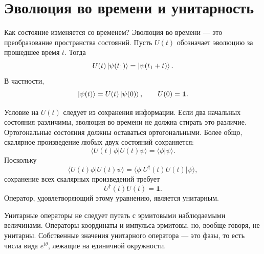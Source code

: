 \section{Эволюция во времени и унитарность}

Как состояние изменяется со временем? Эволюция во времени — это преобразование пространства состояний. Пусть \(U(t)\) обозначает эволюцию за прошедшее время \(t\). Тогда
\begin{equation}
U(t)\left\lvert\psi(t_1)\right\rangle=\left\lvert\psi(t_1+t)\right\rangle.
\end{equation}
В частности,
\begin{equation}
\left\lvert\psi(t)\right\rangle=U(t)\left\lvert\psi(0)\right\rangle,
\qquad
U(0)=\mathbf 1.
\end{equation}

Условие на \(U(t)\) следует из сохранения информации. Если два начальных состояния различимы, эволюция во времени не должна стирать это различие. Ортогональные состояния должны оставаться ортогональными. Более общо, скалярное произведение любых двух состояний сохраняется:
\begin{equation}
\langle U(t)\phi|U(t)\psi\rangle
=\langle\phi|\psi\rangle.
\end{equation}
Поскольку
\begin{equation}
\langle U(t)\phi|U(t)\psi\rangle
=\langle\phi|U^\dagger(t)U(t)|\psi\rangle,
\end{equation}
сохранение всех скалярных произведений требует
\begin{equation}
U^\dagger(t)U(t)=\mathbf 1.
\end{equation}
Оператор, удовлетворяющий этому уравнению, является унитарным.

\begin{classroomqa}
\end{classroomqa}


Унитарные операторы не следует путать с эрмитовыми наблюдаемыми величинами. Операторы координаты и импульса эрмитовы, но, вообще говоря, не унитарны. Собственные значения унитарного оператора — это фазы, то есть числа вида \(e^{i\theta}\), лежащие на единичной окружности.

